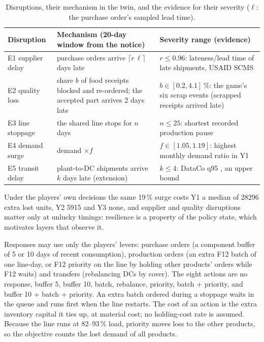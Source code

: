 \documentclass{ifacconf}
\begin{document}
\begin{table}[t]
\caption{Disruptions, their mechanism in the twin, and the evidence for their severity ($\ell$: the purchase
order's sampled lead time).}
\label{tab:disruptions}
\centering\small
\begin{tabular}{@{}p{2.4cm}p{6.6cm}p{8.0cm}@{}}
\toprule
Disruption & Mechanism (20-day window from the notice) & Severity range (evidence)\\
\midrule
E1 supplier delay & purchase orders arrive $\lceil r\,\ell\rceil$ days late &
$r \le 0.96$: lateness/lead time of late shipments, USAID SCMS \citep{usaid_scms}\\
E2 quality loss & share $b$ of food receipts blocked and re-ordered; the accepted part arrives 2 days late &
$b \in [0.2, 4.1]\,\%$: the game's six scrap events (scrapped receipts arrived late)\\
E3 line stoppage & the shared line stops for $n$ days & $n \le 25$: shortest recorded production pause\\
E4 demand surge & demand $\times f$ & $f \in [1.05, 1.19]$: highest monthly demand ratio in Y1\\
E5 transit delay & plant-to-DC shipments arrive $k$ days late (extension) & $k \le 4$: DataCo q95
\citep{dataco2019}, an upper bound\\
\bottomrule
\end{tabular}
\end{table}

Under the players' own decisions the same 19\,\% surge costs Y1 a median of \num{28296} extra lost units, Y2
\num{5915} and Y3 none, and supplier and quality disruptions matter only at unlucky timings: resilience is a
property of the policy state, which motivates layers that observe it.

Responses may use only the players' levers: purchase orders (a component buffer of 5 or 10 days of recent
consumption), production orders (an extra F12 batch of one line-day, or F12 priority on the line by holding other
products' orders while F12 waits) and transfers (rebalancing DCs by cover). The eight actions are no response,
buffer 5, buffer 10, batch, rebalance, priority, batch + priority, and buffer 10 + batch + priority. An extra batch
ordered during a stoppage waits in the queue and runs first when the line restarts. The cost of an action is the
extra inventory capital it ties up, at material cost; no holding-cost rate is assumed. Because the line runs at
82--93\,\% load, priority moves loss to the other products, so the objective counts the lost demand of all
products.
\end{document}

